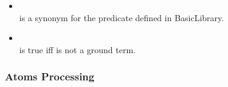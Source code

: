 \begin{itemize}
%
\item {}\\
\noindent{} is a synonym for the  predicate
defined in BasicLibrary.\\
%
\item {}\\
\noindent{} is true iff  is not a ground
term.\\
%
\end{itemize}

\subsubsection{Atoms Processing}

